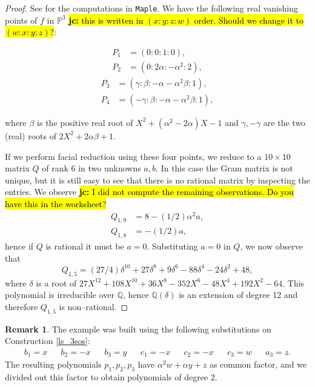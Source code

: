 \documentclass[a4paper,11pt]{amsart}%
\newcommand{\code}[1]{\texttt{#1}}
\newcommand\jc[1]{\hl{{\bf jc:} #1}}
\newcommand\Q{\mathbb{Q}}
\renewcommand\P{\mathbb{P}}
\theoremstyle{definition}
\newtheorem{remark}[theorem]{Remark}
\begin{document}
\begin{proof} See \cite{worksheets3644} for the computations in \code{Maple}.
We have the following real vanishing points of $f$ in $\P^3$ \jc{this is written in $(x:y:z:w)$ order. Should we change it to $(w:x:y:z)$?}:
\begin{multicols}{2}\noindent
\begin{align*}
P_1&=(0:0:1:0),\\
P_2&=(0:2\alpha:-\alpha^2:2),
\end{align*}
\begin{align*}
P_3&=(\gamma:\beta:-\alpha-\alpha^2\beta:1),\\
P_4&=(-\gamma:\beta:-\alpha-\alpha^2\beta:1),
\end{align*}
\end{multicols}
\noindent where $\beta$ is the positive real root of $X^2+(\alpha^2-2\alpha)X-1$ and $\gamma,-\gamma$ are the two (real)
roots of $2X^2+2\alpha\beta+1$.

If we perform facial reduction using these four points, we reduce to a $10 \times 10$ matrix $Q$ of rank 6 in two unknowns $a, b$.
In this case the Gram matrix is not unique, but it is still easy to see that there is no rational matrix by inspecting the entries. 
We observe \jc{I did not compute the remaining observations. Do you have this in the worksheet?}
\begin{align*}
Q_{1,9} &= 8-(1/2) \alpha^2 a, \\
Q_{1,8} &= -(1/2) a,
\end{align*}
hence if $Q$ is rational it must be $a = 0$.
Substituting $a = 0$ in $Q$, we now observe that 
$$Q_{1,5} = (27/4) \delta^{10}+27 \delta^8+9\delta^6-88\delta^4-24\delta^2+48,$$
where $\delta$ is a root of $27 X^{12}+108X^{10}+36X^8-352X^6-48X^4+192X^2-64$. This polynomial is irreducible over $\Q$, hence $\Q(\delta)$ is an extension of degree 12 and therefore $Q_{1,5}$ is non--rational.
\end{proof}

\begin{remark}\label{remark:subs44}
The example was built using the following substitutions on Construction \ref{ls_3sos}:
\begin{align*}
  b_1 = x && b_2 = -x && b_3 = y && c_1 = -x && c_2 = -x && c_3 = w && a_3 = z.
\end{align*}
The resulting polynomials $p_1, p_2, p_3$ have $\alpha^2 w+\alpha y+z$ as common factor, and we divided out this factor to obtain polynomials of degree $2$.
\end{remark}
\end{document}
